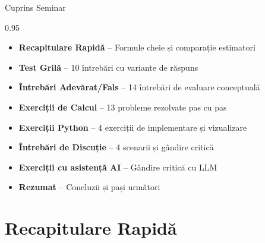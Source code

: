 \documentclass[9pt, aspectratio=169, t]{beamer}
\subtitle{Seminar 5: Estimatori de Volatilitate}
\begin{document}
{
\begin{frame}
    \titlepage
\end{frame}
}

\begin{frame}{Cuprins Seminar}
    \begin{cminipage}{0.95\textwidth}
    \begin{itemize}\setlength{\itemsep}{0pt}
        \item \textbf{Recapitulare Rapidă} -- Formule cheie și comparație estimatori
        \vspace{0.15cm}
        \item \textbf{Test Grilă} -- 10 întrebări cu variante de răspuns
        \vspace{0.15cm}
        \item \textbf{Întrebări Adevărat/Fals} -- 14 întrebări de evaluare conceptuală
        \vspace{0.15cm}
        \item \textbf{Exerciții de Calcul} -- 13 probleme rezolvate pas cu pas
        \vspace{0.15cm}
        \item \textbf{Exerciții Python} -- 4 exerciții de implementare și vizualizare
        \vspace{0.15cm}
        \item \textbf{Întrebări de Discuție} -- 4 scenarii și gândire critică
        \vspace{0.15cm}
        \item \textbf{Exerciții cu asistență AI} -- Gândire critică cu LLM
        \vspace{0.15cm}
        \item \textbf{Rezumat} -- Concluzii și pași următori
    \end{itemize}
    \end{cminipage}
\end{frame}

\section{Recapitulare Rapidă}
\end{document}
